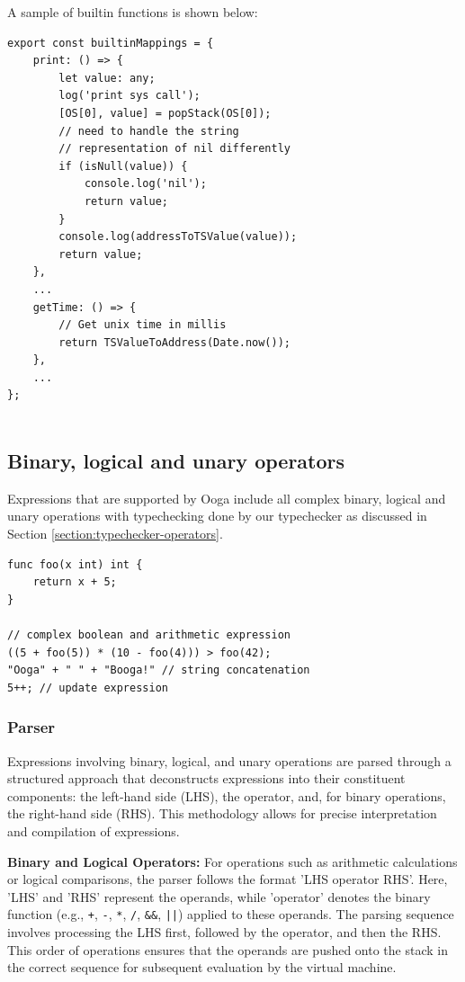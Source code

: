 \documentclass{report}
\begin{document}
A sample of builtin functions is shown below:

\begin{verbatim}
export const builtinMappings = {
    print: () => {
        let value: any;
        log('print sys call');
        [OS[0], value] = popStack(OS[0]);
        // need to handle the string 
        // representation of nil differently
        if (isNull(value)) {
            console.log('nil');
            return value;
        }
        console.log(addressToTSValue(value));
        return value;
    },
    ...
    getTime: () => {
        // Get unix time in millis
        return TSValueToAddress(Date.now());
    },
    ...
};
    
\end{verbatim}

\subsection{Binary, logical and unary operators}

Expressions that are supported by Ooga include all complex binary, logical and unary operations with typechecking done by our typechecker as discussed in Section \ref{section:typechecker-operators}.

\begin{verbatim}
func foo(x int) int {
    return x + 5;
}

// complex boolean and arithmetic expression
((5 + foo(5)) * (10 - foo(4))) > foo(42);
"Ooga" + " " + "Booga!" // string concatenation
5++; // update expression
\end{verbatim}

\subsubsection{Parser}

Expressions involving binary, logical, and unary operations are parsed through a structured approach that deconstructs expressions into their constituent components: the left-hand side (LHS), the operator, and, for binary operations, the right-hand side (RHS). This methodology allows for precise interpretation and compilation of expressions.

\textbf{Binary and Logical Operators:} For operations such as arithmetic calculations or logical comparisons, the parser follows the format 'LHS operator RHS'. Here, 'LHS' and 'RHS' represent the operands, while 'operator' denotes the binary function (e.g., \texttt{+}, \texttt{-}, \texttt{*}, \texttt{/}, \texttt{\&\&}, \texttt{||}) applied to these operands. The parsing sequence involves processing the LHS first, followed by the operator, and then the RHS. This order of operations ensures that the operands are pushed onto the stack in the correct sequence for subsequent evaluation by the virtual machine.
\end{document}
